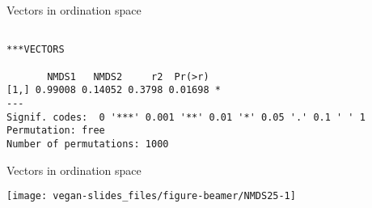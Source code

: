 \documentclass[10pt,ignorenonframetext,compress, aspectratio=169]{beamer}
\newenvironment{Shaded}{\begin{snugshade}}{\end{snugshade}}
\newcommand{\KeywordTok}[1]{\textcolor[rgb]{0.13,0.29,0.53}{\textbf{{#1}}}}
\newcommand{\DataTypeTok}[1]{\textcolor[rgb]{0.13,0.29,0.53}{{#1}}}
\newcommand{\DecValTok}[1]{\textcolor[rgb]{0.00,0.00,0.81}{{#1}}}
\newcommand{\StringTok}[1]{\textcolor[rgb]{0.31,0.60,0.02}{{#1}}}
\newcommand{\OtherTok}[1]{\textcolor[rgb]{0.56,0.35,0.01}{{#1}}}
\newcommand{\NormalTok}[1]{{#1}}
\begin{document}
\begin{frame}[fragile]{Vectors in ordination space}

\scriptsize

\begin{Shaded}
\end{Shaded}

\begin{verbatim}

***VECTORS

       NMDS1   NMDS2     r2  Pr(>r)  
[1,] 0.99008 0.14052 0.3798 0.01698 *
---
Signif. codes:  0 '***' 0.001 '**' 0.01 '*' 0.05 '.' 0.1 ' ' 1
Permutation: free
Number of permutations: 1000
\end{verbatim}

\normalsize

\end{frame}

\begin{frame}[fragile]{Vectors in ordination space}

\scriptsize

\begin{Shaded}
\end{Shaded}

\begin{center}\texttt{[image: vegan-slides\_files/figure-beamer/NMDS25-1]} \end{center}

\normalsize

\end{frame}
\end{document}
